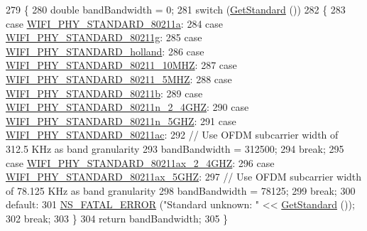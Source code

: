 \begin{DoxyCode}
279 \{
280   \textcolor{keywordtype}{double} bandBandwidth = 0;
281   \textcolor{keywordflow}{switch} (\hyperlink{classns3_1_1WifiPhy_af33f60586f8e0bd1763b863e7ce193b2}{GetStandard} ())
282     \{
283     \textcolor{keywordflow}{case} \hyperlink{group__wifi_gga1299834f4e1c615af3ca738033b76a49a22db1e8022db2c3450414b86c77b11e4}{WIFI\_PHY\_STANDARD\_80211a}:
284     \textcolor{keywordflow}{case} \hyperlink{group__wifi_gga1299834f4e1c615af3ca738033b76a49aeda6d90f260393ce003ec4765d8100af}{WIFI\_PHY\_STANDARD\_80211g}:
285     \textcolor{keywordflow}{case} \hyperlink{group__wifi_gga1299834f4e1c615af3ca738033b76a49aca926d77ddca0fc6d8cdcb190b2e520e}{WIFI\_PHY\_STANDARD\_holland}:
286     \textcolor{keywordflow}{case} \hyperlink{group__wifi_gga1299834f4e1c615af3ca738033b76a49aff863c98db467eb76170dc8bbe743de7}{WIFI\_PHY\_STANDARD\_80211\_10MHZ}:
287     \textcolor{keywordflow}{case} \hyperlink{group__wifi_gga1299834f4e1c615af3ca738033b76a49a8311083bdd8ae58e73ab6e81a53fd7be}{WIFI\_PHY\_STANDARD\_80211\_5MHZ}:
288     \textcolor{keywordflow}{case} \hyperlink{group__wifi_gga1299834f4e1c615af3ca738033b76a49a77e1cc9f77a0bce8e2bc82cbef437b5a}{WIFI\_PHY\_STANDARD\_80211b}:
289     \textcolor{keywordflow}{case} \hyperlink{group__wifi_gga1299834f4e1c615af3ca738033b76a49a6e449a5ca14fc7c0eb36064ce04a5192}{WIFI\_PHY\_STANDARD\_80211n\_2\_4GHZ}:
290     \textcolor{keywordflow}{case} \hyperlink{group__wifi_gga1299834f4e1c615af3ca738033b76a49aaabe94a0be4668583c42595437b4a6c0}{WIFI\_PHY\_STANDARD\_80211n\_5GHZ}:
291     \textcolor{keywordflow}{case} \hyperlink{group__wifi_gga1299834f4e1c615af3ca738033b76a49a7c078959de635b84fb280a955dcfb27e}{WIFI\_PHY\_STANDARD\_80211ac}:
292       \textcolor{comment}{// Use OFDM subcarrier width of 312.5 KHz as band granularity}
293       bandBandwidth = 312500;
294       \textcolor{keywordflow}{break};
295     \textcolor{keywordflow}{case} \hyperlink{group__wifi_gga1299834f4e1c615af3ca738033b76a49a21cd71f16aa85df0b571d52f9217f330}{WIFI\_PHY\_STANDARD\_80211ax\_2\_4GHZ}:
296     \textcolor{keywordflow}{case} \hyperlink{group__wifi_gga1299834f4e1c615af3ca738033b76a49af5b1e598f5b0d88c961c90ad1742355f}{WIFI\_PHY\_STANDARD\_80211ax\_5GHZ}:
297       \textcolor{comment}{// Use OFDM subcarrier width of 78.125 KHz as band granularity}
298       bandBandwidth = 78125;
299       \textcolor{keywordflow}{break};
300     \textcolor{keywordflow}{default}:
301       \hyperlink{group__fatal_ga5131d5e3f75d7d4cbfd706ac456fdc85}{NS\_FATAL\_ERROR} (\textcolor{stringliteral}{"Standard unknown: "} << \hyperlink{classns3_1_1WifiPhy_af33f60586f8e0bd1763b863e7ce193b2}{GetStandard} ());
302       \textcolor{keywordflow}{break};
303     \}
304   \textcolor{keywordflow}{return} bandBandwidth;
305 \}
\end{DoxyCode}


